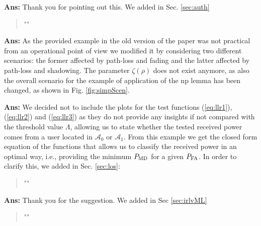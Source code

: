 \documentclass[draftcls,onecolumn,12pt]{IEEEtran}
\newcounter{revc}
\newcommand{\revp}[1]{\zref[revcontent]{#1}}
\begin{document}
{\bf Ans:} Thank you for pointing out this. We added in Sec. \ref{sec:auth}
\begin{quote}
"\revp{lambda}"
\end{quote}

\vspace{5mm} %
\begin{framed}
\end{framed}

{\bf Ans:} As the provided example in the old version of the paper was not practical from an operational point of view we modified it by considering two different scenarios: the former affected by path-loss and fading and the latter affected by path-loss and shadowing. The parameter $\zeta(\rho)$ does not exist anymore, as also the overall scenario for the example of application of the \ac{np} lemma has been changed, as shown in Fig. \ref{fig:simpScen}. 

\vspace{5mm} %
\begin{framed}
\end{framed}

{\bf Ans:} We decided not to include the plots for the test functions (\ref{eq:llr1}), (\ref{eq:llr2}) and (\ref{eq:llr3}) as they do not provide any insights if not compared with the threshold value $\Lambda$, allowing us to state whether the tested received power comes from a user located in $\mathcal{A}_0$ or $\mathcal{A}_1$. From this example we get the closed form equation of the functions that allows us to classify the received power in an optimal way, i.e., providing the minimum $P_{\rm MD}$ for a given $P_{\rm FA}$. In order to clarify this, we added in Sec. \ref{sec:los}:
\begin{quote}
"\revp{llrComp}"
\end{quote}

\vspace{5mm} %
\begin{framed}
\end{framed}

{\bf Ans:} Thank you for the suggestion. We added in Sec \ref{sec:irlvML}
\begin{quote}
"\revp{supervised}"
\end{quote}
\end{document}
